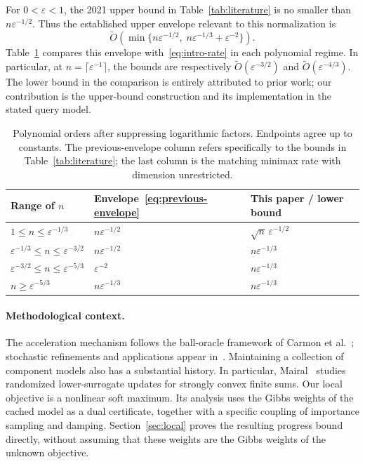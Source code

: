 \documentclass[11pt,a4paper]{article}
\theoremstyle{definition}\newtheorem{definition}[theorem]{Definition}
\theoremstyle{remark}\newtheorem{remark}[theorem]{Remark}
\newcommand{\eps}{\varepsilon}
\newcommand{\tO}{\widetilde O}
\begin{document}
For $0<\eps<1$, the 2021 upper bound in Table~\ref{tab:literature} is no
smaller than $n\eps^{-1/2}$. Thus the established upper envelope relevant
to this normalization is
\begin{equation}\label{eq:previous-envelope}
 \tO\!\left(\min\{n\eps^{-1/2},\;n\eps^{-1/3}+\eps^{-2}\}\right).
\end{equation}
Table~\ref{tab:regimes} compares this envelope with~\eqref{eq:intro-rate}
in each polynomial regime. In particular, at
$n=\lceil\eps^{-1}\rceil$, the bounds are respectively
$\tO(\eps^{-3/2})$ and $\tO(\eps^{-4/3})$.
The lower bound in the comparison is entirely attributed to prior work;
our contribution is the upper-bound construction and its implementation
in the stated query model.

\begin{table}[t]
\centering
\small
\renewcommand{\arraystretch}{1.35}
\begin{tabular}{@{}lll@{}}
\toprule
Range of $n$ & Envelope~\eqref{eq:previous-envelope} & This paper / lower bound\\
\midrule
$1\le n\le\eps^{-1/3}$
& $n\eps^{-1/2}$ & $\sqrt n\,\eps^{-1/2}$\\
$\eps^{-1/3}\le n\le\eps^{-3/2}$
& $n\eps^{-1/2}$ & $n\eps^{-1/3}$\\
$\eps^{-3/2}\le n\le\eps^{-5/3}$
& $\eps^{-2}$ & $n\eps^{-1/3}$\\
$n\ge\eps^{-5/3}$
& $n\eps^{-1/3}$ & $n\eps^{-1/3}$\\
\bottomrule
\end{tabular}
\caption{Polynomial orders after suppressing logarithmic factors. Endpoints
agree up to constants. The previous-envelope column refers specifically to
the bounds in Table~\ref{tab:literature}; the last column is the matching
minimax rate with dimension unrestricted.}
\label{tab:regimes}
\end{table}

\paragraph{Methodological context.}
The acceleration mechanism follows the ball-oracle framework of
Carmon et al.~\cite{ballaccel,inside}; stochastic refinements and
applications appear in~\cite{stochastic,ballgame}. Maintaining a collection
of component models also has a substantial history. In particular,
Mairal~\cite[Section~3.2]{miso} studies randomized lower-surrogate updates
for strongly convex finite sums. Our local objective is a nonlinear soft
maximum. Its analysis uses the Gibbs weights of the cached model as a
dual certificate, together with a specific coupling of importance sampling
and damping. Section~\ref{sec:local} proves the resulting progress bound
directly, without assuming that these weights are the Gibbs weights of
the unknown objective.
\end{document}
